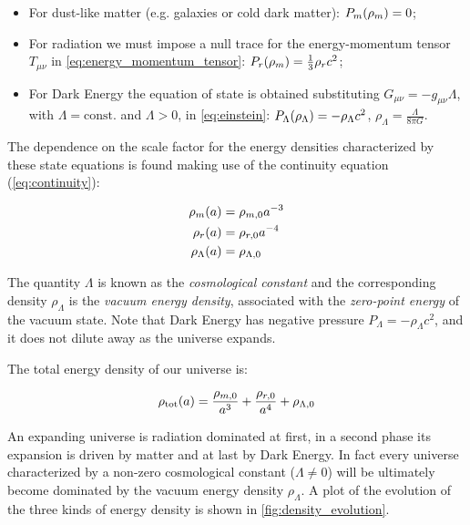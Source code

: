 \begin{itemize}
        \item For dust-like matter (e.g. galaxies or cold dark matter):
        $P_m\qty(\rho_m) = 0$;
        \item For radiation we must impose a null trace for the energy-momentum
        tensor $T_{\mu \nu}$ in \autoref{eq:energy_momentum_tensor}: $P_r\qty(\rho_m)
        = \frac{1}{3} \rho_r c^2$;
        \item For Dark Energy the equation of state is obtained
        substituting  $G_{\mu \nu} = -g_{\mu \nu} \Lambda$, with $\Lambda =
        \text{const.}$ and $\Lambda > 0$, in \autoref{eq:einstein}:
        $P_\Lambda\qty(\rho_\Lambda) = -\rho_\Lambda c^2$, $\rho_\Lambda =
        \frac{\Lambda}{8\pi G}$.
\end{itemize}

The dependence on the scale factor for the energy densities characterized by
these state equations is found making use of the continuity equation
(\autoref{eq:continuity}):

\begin{align}
        \rho_m\qty(a) & = \rho_{m,0}a^{-3} \label{eq:rho_m} \\
        \rho_r\qty(a) & = \rho_{r,0}a^{-4} \label{eq:rho_r} \\
        \rho_\Lambda\qty(a) & = \rho_{\Lambda,0} \label{eq:rho_lambda} \\
\end{align}

The quantity $\Lambda$ is known as the \emph{cosmological constant} and the
corresponding density $\rho_\Lambda$ is the \emph{vacuum energy density},
associated with the \emph{zero-point energy} of the vacuum state. Note that
Dark Energy has negative pressure $P_\Lambda = -\rho_\Lambda c^2$, and it
does not dilute away as the universe expands.

The total energy density of our universe is:

\begin{equation}
        \rho_\text{tot}\qty(a) = \frac{\rho_{m,0}}{a^3} + \frac{\rho_{r,0}}{a^4} +
        \rho_{\Lambda,0}
\end{equation}

An expanding universe is radiation dominated at first, in a second phase
its expansion is driven by matter and at last by Dark Energy. In fact every
universe characterized by a non-zero cosmological constant ($\Lambda \neq
0$) will be ultimately become dominated by the vacuum energy density
$\rho_\Lambda$. A plot of the evolution of the three kinds of energy
density is shown in \autoref{fig:density_evolution}.

